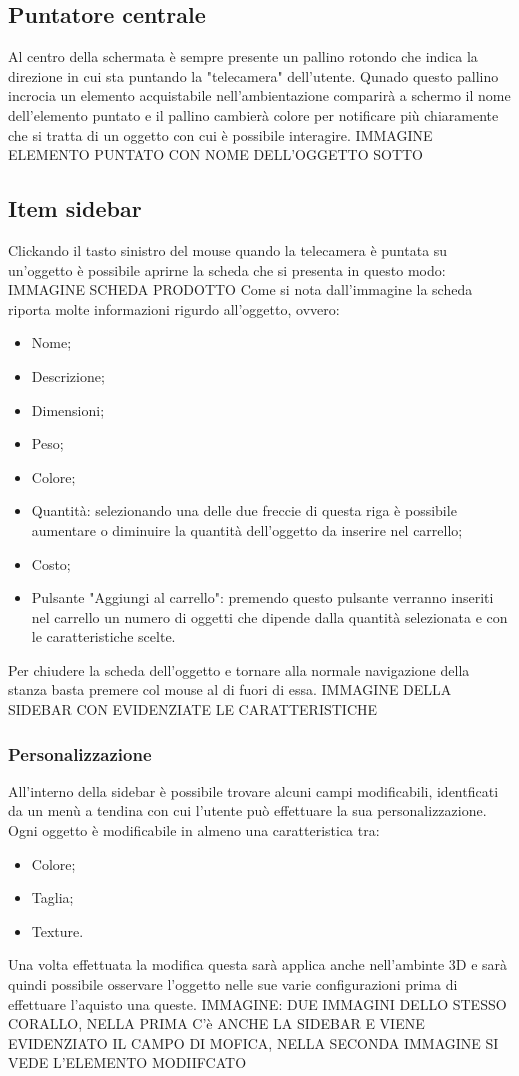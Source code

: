 \subsection{Puntatore centrale}
Al centro della schermata è sempre presente un pallino rotondo che indica la direzione in cui sta puntando la "telecamera" dell'utente. Qunado questo pallino incrocia un elemento acquistabile nell'ambientazione comparirà a schermo il nome dell'elemento puntato e il pallino cambierà colore per notificare più chiaramente che si tratta di un oggetto con cui è possibile interagire.
IMMAGINE ELEMENTO PUNTATO CON NOME DELL'OGGETTO SOTTO
\subsection{Item sidebar}
Clickando il tasto sinistro del mouse quando la telecamera è puntata su un'oggetto è possibile aprirne la scheda che si presenta in questo modo:
IMMAGINE SCHEDA PRODOTTO
Come si nota dall'immagine la scheda riporta molte informazioni rigurdo all'oggetto, ovvero:
\begin{itemize}
	\item Nome;
	\item Descrizione;
	\item Dimensioni;
	\item Peso;
	\item Colore;
	\item Quantità: selezionando una delle due freccie di questa riga è possibile aumentare o diminuire la quantità dell'oggetto da inserire nel carrello;
	\item Costo;
	\item Pulsante "Aggiungi al carrello": premendo questo pulsante verranno inseriti nel carrello un numero di oggetti che dipende dalla quantità selezionata e con le caratteristiche scelte.
\end{itemize}

Per chiudere la scheda dell'oggetto e tornare alla normale navigazione della stanza basta premere col mouse al di fuori di essa.
IMMAGINE DELLA SIDEBAR CON EVIDENZIATE LE CARATTERISTICHE
\subsubsection{Personalizzazione}
All'interno della sidebar è possibile trovare alcuni campi modificabili, identficati da un menù a tendina con cui l'utente può effettuare la sua personalizzazione.
Ogni oggetto è modificabile in almeno una caratteristica tra:
\begin{itemize}
	\item Colore;
	\item Taglia;
	\item Texture.
\end{itemize}
Una volta effettuata la modifica questa sarà applica anche nell'ambinte 3D e sarà quindi possibile osservare l'oggetto nelle sue varie configurazioni prima di effettuare l'aquisto una queste.
IMMAGINE: DUE IMMAGINI DELLO STESSO CORALLO, NELLA PRIMA C'è ANCHE LA SIDEBAR E VIENE EVIDENZIATO IL CAMPO DI MOFICA, NELLA SECONDA IMMAGINE SI VEDE L'ELEMENTO MODIIFCATO
